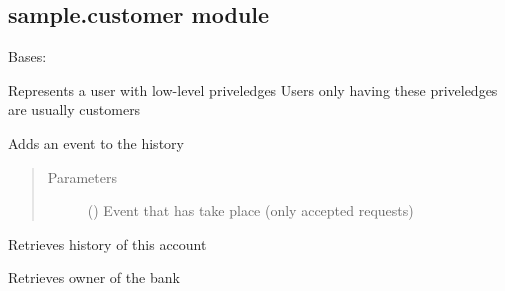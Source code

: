 \documentclass[letterpaper,10pt,english]{sphinxmanual}
\begin{document}
\subsection{sample.customer module}
\label{\detokenize{sample:sample-customer-module}}\label{\detokenize{sample:module-sample.customer}}

\begin{fulllineitems}
\label{\detokenize{sample:sample.customer.Customer}}
Bases: 

Represents a user with low-level priveledges
Users only having these priveledges are usually customers

\begin{fulllineitems}
\label{\detokenize{sample:sample.customer.Customer.addHistory}}
Adds an event to the history
\begin{quote}\begin{description}
\item[{Parameters}] \leavevmode
{} () \textendash{} Event that has take place (only accepted requests)

\end{description}\end{quote}

\end{fulllineitems}


\begin{fulllineitems}
\label{\detokenize{sample:sample.customer.Customer.getHistory}}
Retrieves history of this account

\end{fulllineitems}


\begin{fulllineitems}
\label{\detokenize{sample:sample.customer.Customer.getOwner}}
Retrieves owner of the bank


\end{fulllineitems}
\end{fulllineitems}
\end{document}
